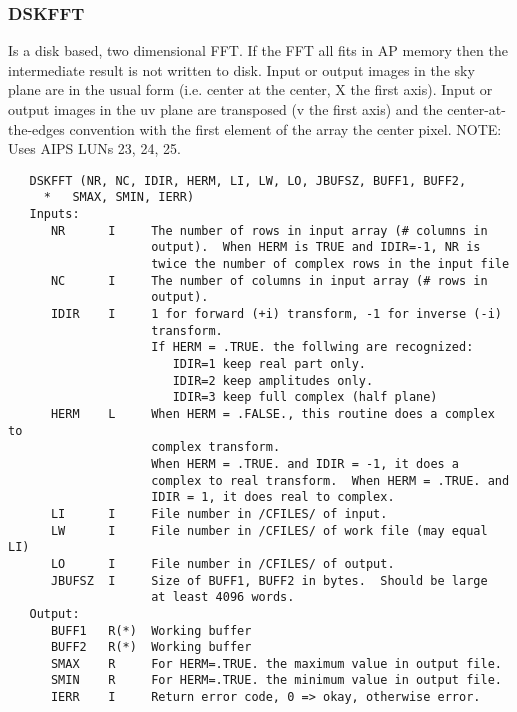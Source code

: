 \subsubsection{DSKFFT}
Is a disk based, two dimensional FFT.  If the FFT all fits
in AP memory then the intermediate result is not written to disk.
Input or output images in the sky plane are in the usual form
(i.e. center at the center, X the first axis).  Input or output
images in the uv plane are transposed (v the first axis) and the
center-at-the-edges convention with the first element of the array
the center pixel.    NOTE: Uses AIPS LUNs 23, 24, 25.
\begin{verbatim}
   DSKFFT (NR, NC, IDIR, HERM, LI, LW, LO, JBUFSZ, BUFF1, BUFF2,
     *   SMAX, SMIN, IERR)
   Inputs:
      NR      I     The number of rows in input array (# columns in
                    output).  When HERM is TRUE and IDIR=-1, NR is
                    twice the number of complex rows in the input file
      NC      I     The number of columns in input array (# rows in
                    output).
      IDIR    I     1 for forward (+i) transform, -1 for inverse (-i)
                    transform.
                    If HERM = .TRUE. the follwing are recognized:
                       IDIR=1 keep real part only.
                       IDIR=2 keep amplitudes only.
                       IDIR=3 keep full complex (half plane)
      HERM    L     When HERM = .FALSE., this routine does a complex to
                    complex transform.
                    When HERM = .TRUE. and IDIR = -1, it does a
                    complex to real transform.  When HERM = .TRUE. and
                    IDIR = 1, it does real to complex.
      LI      I     File number in /CFILES/ of input.
      LW      I     File number in /CFILES/ of work file (may equal LI)
      LO      I     File number in /CFILES/ of output.
      JBUFSZ  I     Size of BUFF1, BUFF2 in bytes.  Should be large
                    at least 4096 words.
   Output:
      BUFF1   R(*)  Working buffer
      BUFF2   R(*)  Working buffer
      SMAX    R     For HERM=.TRUE. the maximum value in output file.
      SMIN    R     For HERM=.TRUE. the minimum value in output file.
      IERR    I     Return error code, 0 => okay, otherwise error.
\end{verbatim}

